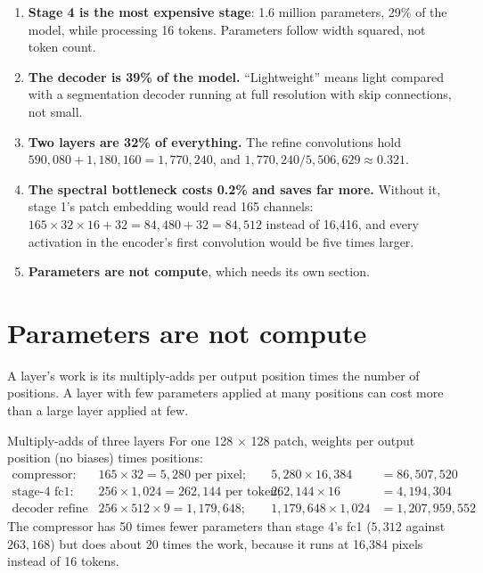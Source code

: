 \begin{enumerate}
\item \textbf{Stage 4 is the most expensive stage}: 1.6 million parameters, 29\% of the model, while
processing 16 tokens. Parameters follow width squared, not token count.
\item \textbf{The decoder is 39\% of the model.} ``Lightweight'' means light compared with a
segmentation decoder running at full resolution with skip connections, not small.
\item \textbf{Two layers are 32\% of everything.} The refine convolutions hold
$590{,}080 + 1{,}180{,}160 = 1{,}770{,}240$, and $1{,}770{,}240 / 5{,}506{,}629 \approx 0.321$.
\item \textbf{The spectral bottleneck costs 0.2\% and saves far more.} Without it, stage 1's patch
embedding would read 165 channels: $165 \times 32 \times 16 + 32 = 84{,}480 + 32 = 84{,}512$ instead of
16,416, and every activation in the encoder's first convolution would be five times larger.
\item \textbf{Parameters are not compute}, which needs its own section.
\end{enumerate}

\section{Parameters are not compute}\label{sec:params:compute}

A layer's work is its multiply-adds per output position times the number of positions. A layer with few
parameters applied at many positions can cost more than a large layer applied at few.

\begin{worked}[label={we:params:macs}]{Multiply-adds of three layers}
For one 128 $\times$ 128 patch, weights per output position (no biases) times positions:
\begin{align*}
\text{compressor:}\quad & 165 \times 32 = 5{,}280 \text{ per pixel}; & 5{,}280 \times 16{,}384 &= 86{,}507{,}520\\
\text{stage-4 fc1:}\quad & 256 \times 1{,}024 = 262{,}144 \text{ per token}; & 262{,}144 \times 16 &= 4{,}194{,}304\\
\text{decoder refine 2:}\quad & 256 \times 512 \times 9 = 1{,}179{,}648; & 1{,}179{,}648 \times 1{,}024 &= 1{,}207{,}959{,}552
\end{align*}
The compressor has 50 times fewer parameters than stage 4's fc1 ($5{,}312$ against $263{,}168$) but does
about 20 times the work, because it runs at 16,384 pixels instead of 16 tokens.
\end{worked}

